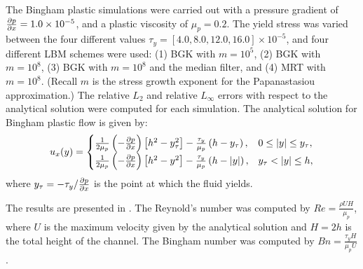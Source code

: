 \documentclass[pdftex,ms]{pittetd}
\begin{document}
The Bingham plastic simulations were carried out with a pressure gradient of $\frac{\partial p}{\partial x} = 1.0 \times 10^{-5}$, and a plastic viscosity of $\mu_p = 0.2$.
The yield stress was varied between the four different values $\tau_y = [4.0, 8.0, 12.0, 16.0] \times 10^{-5}$, and four different LBM schemes were used: (1) BGK with $m = 10^5$, (2) BGK with $m = 10^8$, (3) BGK with $m = 10^8$ and the median filter, and (4) MRT with $m = 10^8$. 
(Recall $m$ is the stress growth exponent for the Papanastasiou approximation.)
The relative $L_2$ and relative $L_{\infty}$ errors with respect to the analytical solution were computed for each simulation.
The analytical solution for Bingham plastic flow is given by:
\begin{equation} \label{eq:analytical-bingham}
u_x(y) = \begin{cases}
\frac{1}{2 \mu_p} \left(-\frac{\partial p}{\partial x}\right) \left[h^2 - y_{\tau}^2 \right] - \frac{\tau_y}{\mu_p} \left(h - y_{\tau}\right), & 0 \leq |y| \leq y_{\tau}, \\
\frac{1}{2 \mu_p} \left(-\frac{\partial p}{\partial x}\right) \left[h^2 - y^2 \right] - \frac{\tau_y}{\mu_p} \left(h - |y|\right), & y_{\tau} < |y| \leq h,
\end{cases}
\end{equation}
\noindent where $y_{\tau} = -\tau_y / \frac{\partial p}{\partial x}$ is the point at which the fluid yields.

The results are presented in .
The Reynold's number was computed by $Re = \frac{\rho U H}{\mu_p}$, where $U$ is the maximum velocity given by the analytical solution and $H = 2h$ is the total height of the channel.
The Bingham number was computed by $Bn = \frac{\tau_y H}{\mu_p U}$.

\end{document}

